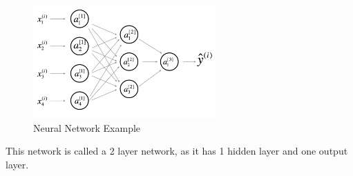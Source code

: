 \begin{figure}[H]
    \centering
    \includegraphics[width=7cm]{Design/Overview/Algorithms/NeuralNetworks/NeuralNetworkDiagram.png}
    \caption{Neural Network Example}
    \label{fig:my_label}
\end{figure}
This network is called a 2 layer network, as it has 1 hidden layer and one output layer.




